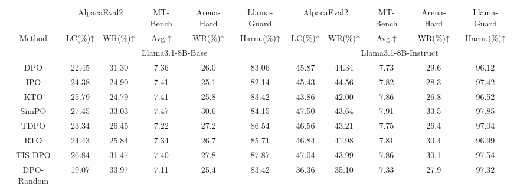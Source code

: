 \begin{table}[]
\centering
\setlength{\tabcolsep}{0.6pt}
\footnotesize
\begin{tabular}{cccccc|ccccc}
\hline
                         & \multicolumn{2}{c}{AlpacaEval2} & MT-Bench & Arena-Hard & Llama-Guard & \multicolumn{2}{c}{AlpacaEval2} & MT-Bench & Arena-Hard & Llama-Guard \\ \cline{2-11} 
\multirow{-2}{*}{Method} & LC(\%)↑        & WR(\%)↑        & Avg.↑    & WR(\%)↑    & Harm.(\%)↑  & LC(\%)↑        & WR(\%)↑        & Avg.↑    & WR(\%)↑    & Harm.(\%)↑  \\ \hline
                         & \multicolumn{5}{c|}{\cellcolor[HTML]{CBCEFB}Llama3.1-8B-Base}         & \multicolumn{5}{c}{\cellcolor[HTML]{CBCEFB}Llama3.1-8B-Instruct}      \\ \hline
DPO                       & 22.45          & 31.30          & 7.36    & 26.0      & 83.06       & 45.87          & 44.34          & 7.73    & 29.6      & 96.12       \\
IPO                      & 24.38          & 24.90          & 7.41    & 25.1      & 82.14       & 45.43          & 44.56          & 7.82    & 28.3      & 97.42       \\
KTO                      & 25.79          & 24.79          & 7.41    & 25.8      & 83.42       & 43.86          & 42.00          & 7.86    & 26.8      & 96.52       \\
SimPO                    &27.45          & 33.03          & 7.47    & 30.6    & 84.15      & 47.50          & 43.64           & 7.91    & 33.5      & 97.85       \\
TDPO                     & 23.34          & 26.45          & 7.22    & 27.2      & 86.54       & 46.56          & 43.21          & 7.75    & 26.4      & 97.04       \\
RTO                      & 24.43          & 25.84          & 7.34    & 26.7      & 85.71       & 46.84          & 41.98          & 7.81    & 30.4      & 96.99       \\
TIS-DPO                  & 26.84          & 31.47          & 7.40    & 27.8      & 87.87       & 47.04         & 43.99          & 7.86    & 30.1      & 97.54       \\
DPO-Random                  & 19.07          & 33.97          & 7.11    & 25.4      & 83.42       & 36.36         & 35.10          & 7.33    & 27.9      & 97.32       \\

\end{tabular}
\end{table}
